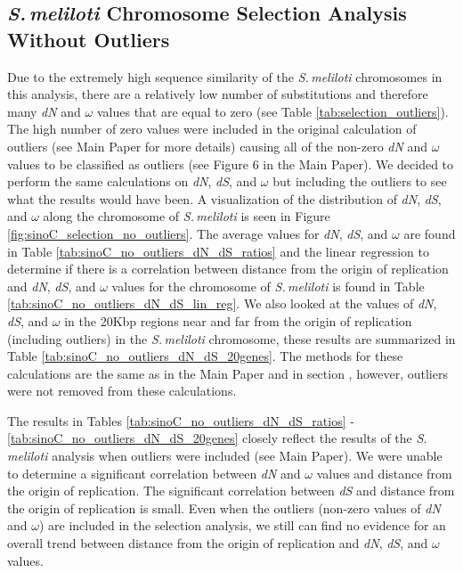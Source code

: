 \documentclass[11pt]{article}
\newcommand{\smel}{\textit{S.\,meliloti}\xspace}
\newcommand{\dn}{\textit{dN}\xspace}
\newcommand{\ds}{\textit{dS}\xspace}
\begin{document}
\subsection{\smel Chromosome Selection Analysis Without Outliers}
Due to the extremely high sequence similarity of the \smel chromosomes in this analysis, there are a relatively low number of substitutions and therefore many \dn and $\omega$ values that are equal to zero (see Table \ref{tab:selection_outliers}).
The high number of zero values were included in the original calculation of outliers (see Main Paper for more details) causing all of the non-zero \dn and $\omega$ values to be classified as outliers (see Figure 6 in the Main Paper).
We decided to perform the same calculations on \dn, \ds, and $\omega$ but including the outliers to see what the results would have been.
A visualization of the distribution of \dn, \ds, and $\omega$ along the chromosome of \smel is seen in Figure \ref{fig:sinoC_selection_no_outliers}.
The average values for \dn, \ds, and $\omega$ are found in Table \ref{tab:sinoC_no_outliers_dN_dS_ratios} and the linear regression to determine if there is a correlation between distance from the origin of replication and \dn, \ds, and $\omega$ values for the chromosome of \smel is found in Table \ref{tab:sinoC_no_outliers_dN_dS_lin_reg}.
We also looked at the values of \dn, \ds, and $\omega$ in the 20Kbp regions near and far from the origin of replication (including outliers) in the \smel chromosome, these results are summarized in Table \ref{tab:sinoC_no_outliers_dN_dS_20genes}.
The methods for these calculations are the same as in the Main Paper and in section , however, outliers were not removed from these calculations.

The results in Tables \ref{tab:sinoC_no_outliers_dN_dS_ratios} - \ref{tab:sinoC_no_outliers_dN_dS_20genes} closely reflect the results of the \smel analysis when outliers were included (see Main Paper).
We were unable to determine a significant correlation between \dn and $\omega$ values and distance from the origin of replication.
The significant correlation between \ds and distance from the origin of replication is small.
Even when the outliers (non-zero values of \dn and $\omega$) are included in the selection analysis, we still can find no evidence for an overall trend between distance from the origin of replication and \dn, \ds, and $\omega$ values.
\end{document}
